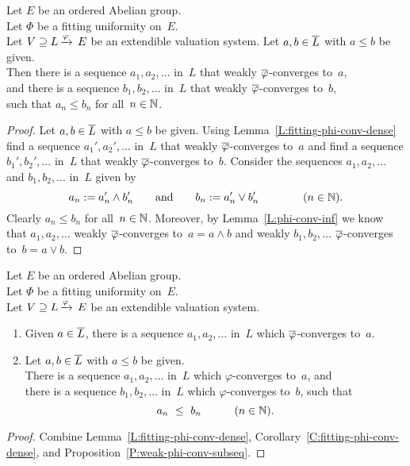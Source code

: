 \documentclass[main.tex]{subfiles}
\begin{document}
%
%
\begin{cor}
\label{C:fitting-phi-conv-dense}
Let $E$ be an ordered Abelian group.\\
Let $\Phi$ be a fitting uniformity on~$E$.\\
Let $V \supseteq L\,\smash{\xrightarrow{\varphi}\,E}$ be an extendible valuation system.
Let $a,b\in \overline L$ with $a\leq b$ be given.\\
Then there is a sequence
$a_1,a_2,\dotsc$ in~$L$ that weakly $\overline\varphi$-converges to~$a$,\\
and there is a sequence
$b_1,b_2,\dotsc$ in~$L$ that weakly $\overline\varphi$-converges to~$b$,\\
such that $a_n \leq b_n$ for all~$n\in\mathbb{N}$.
\end{cor}
\begin{proof}
Let $a,b\in\overline L$ with $a\leq b$ be given.
Using Lemma~\ref{L:fitting-phi-conv-dense}
find a sequence $a_1',a_2',\dotsc$ in~$L$
that weakly $\overline\varphi$-converges to~$a$
and find a sequence $b_1',b_2',\dotsc$ in~$L$
that weakly $\overline\varphi$-converges to~$b$.
Consider the sequences
$a_1,a_2,\dotsc$ and $b_1,b_2,\dotsc$  in~$L$ 
given by  
\begin{equation*}
a_n := a_n'\wedge b_n'
\qquad\text{and}\qquad
b_n := a_n' \vee b_n'
\qquad\qquad(n\in\mathbb{N}).
\end{equation*}
Clearly $a_n \leq b_n$ for all~$n\in \mathbb{N}$.
Moreover,
by Lemma~\ref{L:phi-conv-inf} 
we know that $a_1,a_2,\dotsc$ 
weakly $\overline\varphi$-converges to~$a = a\wedge b$
and weakly $b_1,b_2,\dotsc$ $\overline\varphi$-converges to~$b= a\vee b$.
\end{proof}
%
%
\begin{prop}
\label{P:fitting-phi-conv-dense}
Let $E$ be an ordered Abelian group.\\
Let $\Phi$ be a fitting uniformity on~$E$.\\
Let $V \supseteq L\,\smash{\xrightarrow{\varphi}\,E}$ be an extendible valuation system.
\begin{enumerate}
\item
Given $a\in \overline L$,
 there is a sequence
$a_1,a_2,\dotsc$ in~$L$
which $\overline\varphi$-converges to~$a$.

\item
Let $a,b\in \overline L$ with $a\leq b$ be given.\\
There is a sequence 
$a_1,a_2,\dotsc$ in~$L$
which $\varphi$-converges to~$a$, and \\
there is a sequence
$b_1,b_2,\dotsc$ in~$L$
which $\varphi$-converges to~$b$, such that
\begin{equation*}
a_n \ \leq\ b_n \qquad\quad(n\in\mathbb{N}).
\end{equation*}
\end{enumerate}
\end{prop}
\begin{proof}
Combine Lemma~\ref{L:fitting-phi-conv-dense},
Corollary~\ref{C:fitting-phi-conv-dense},
and Proposition~\ref{P:weak-phi-conv-subseq}.
\end{proof}
\end{document}

